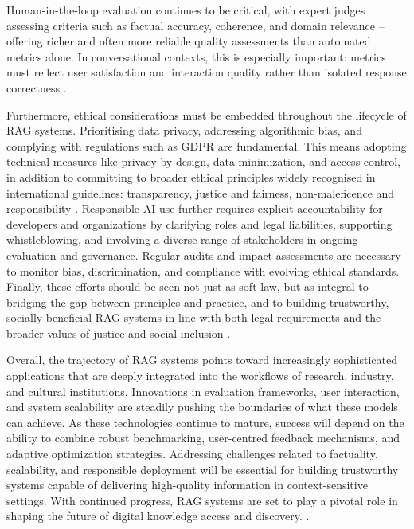 \begin{spacing}{1.5}
Human-in-the-loop evaluation continues to be critical, with expert judges assessing criteria such as factual accuracy, coherence, and domain relevance -- offering richer and often more reliable quality assessments than automated metrics alone. In conversational contexts, this is especially important: metrics must reflect user satisfaction and interaction quality rather than isolated response correctness \citep{gupta_comprehensive_2024}.

Furthermore, ethical considerations must be embedded throughout the lifecycle of RAG systems. Prioritising data privacy, addressing algorithmic bias, and complying with regulations such as GDPR are fundamental. This means adopting technical measures like privacy by design, data minimization, and access control, in addition to committing to broader ethical principles widely recognised in international guidelines: transparency, justice and fairness, non-maleficence and responsibility \citep{jobin_global_2019}. Responsible AI use further requires explicit accountability for developers and organizations by clarifying roles and legal liabilities, supporting whistleblowing, and involving a diverse range of stakeholders in ongoing evaluation and governance. Regular audits and impact assessments are necessary to monitor bias, discrimination, and compliance with evolving ethical standards. Finally, these efforts should be seen not just as soft law, but as integral to bridging the gap between principles and practice, and to building trustworthy, socially beneficial RAG systems in line with both legal requirements and the broader values of justice and social inclusion \citep{ashery_emergent_2025}.

Overall, the trajectory of RAG systems points toward increasingly sophisticated applications that are deeply integrated into the workflows of research, industry, and cultural institutions. Innovations in evaluation frameworks, user interaction, and system scalability are steadily pushing the boundaries of what these models can achieve. As these technologies continue to mature, success will depend on the ability to combine robust benchmarking, user-centred feedback mechanisms, and adaptive optimization strategies. Addressing challenges related to factuality, scalability, and responsible deployment will be essential for building trustworthy systems capable of delivering high-quality information in context-sensitive settings. With continued progress, RAG systems are set to play a pivotal role in shaping the future of digital knowledge access and discovery. \parencite{zaib_conversational_2022,wang_searching_2024, gao_retrieval-augmented_2024}.


\end{spacing}
